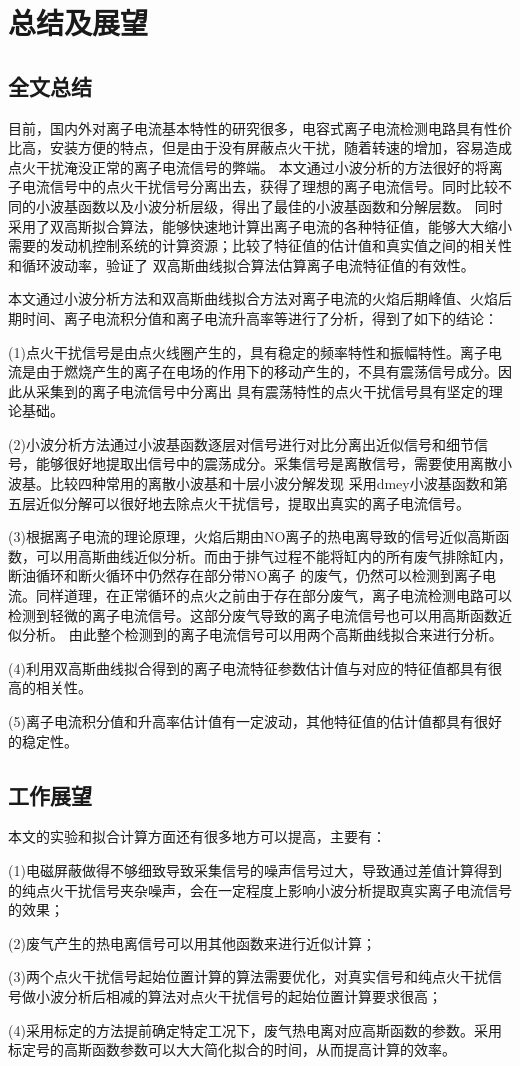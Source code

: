 \chapter{总结及展望}
\section{全文总结}
目前，国内外对离子电流基本特性的研究很多，电容式离子电流检测电路具有性价比高，安装方便的特点，但是由于没有屏蔽点火干扰，随着转速的增加，容易造成点火干扰淹没正常的离子电流信号的弊端。
本文通过小波分析的方法很好的将离子电流信号中的点火干扰信号分离出去，获得了理想的离子电流信号。同时比较不同的小波基函数以及小波分析层级，得出了最佳的小波基函数和分解层数。
同时采用了双高斯拟合算法，能够快速地计算出离子电流的各种特征值，能够大大缩小需要的发动机控制系统的计算资源；比较了特征值的估计值和真实值之间的相关性和循环波动率，验证了
双高斯曲线拟合算法估算离子电流特征值的有效性。\par
本文通过小波分析方法和双高斯曲线拟合方法对离子电流的火焰后期峰值、火焰后期时间、离子电流积分值和离子电流升高率等进行了分析，得到了如下的结论：\par
(1)点火干扰信号是由点火线圈产生的，具有稳定的频率特性和振幅特性。离子电流是由于燃烧产生的离子在电场的作用下的移动产生的，不具有震荡信号成分。因此从采集到的离子电流信号中分离出
具有震荡特性的点火干扰信号具有坚定的理论基础。\par
(2)小波分析方法通过小波基函数逐层对信号进行对比分离出近似信号和细节信号，能够很好地提取出信号中的震荡成分。采集信号是离散信号，需要使用离散小波基。比较四种常用的离散小波基和十层小波分解发现
采用dmey小波基函数和第五层近似分解可以很好地去除点火干扰信号，提取出真实的离子电流信号。\par
(3)根据离子电流的理论原理，火焰后期由NO离子的热电离导致的信号近似高斯函数，可以用高斯曲线近似分析。而由于排气过程不能将缸内的所有废气排除缸内，断油循环和断火循环中仍然存在部分带NO离子
的废气，仍然可以检测到离子电流。同样道理，在正常循环的点火之前由于存在部分废气，离子电流检测电路可以检测到轻微的离子电流信号。这部分废气导致的离子电流信号也可以用高斯函数近似分析。
由此整个检测到的离子电流信号可以用两个高斯曲线拟合来进行分析。\par
(4)利用双高斯曲线拟合得到的离子电流特征参数估计值与对应的特征值都具有很高的相关性。\par
(5)离子电流积分值和升高率估计值有一定波动，其他特征值的估计值都具有很好的稳定性。
\section{工作展望}
本文的实验和拟合计算方面还有很多地方可以提高，主要有：\par
(1)电磁屏蔽\cite{cyb2012,tb2009}做得不够细致导致采集信号的噪声信号过大，导致通过差值计算得到的纯点火干扰信号夹杂噪声，会在一定程度上影响小波分析提取真实离子电流信号的效果；\par
(2)废气产生的热电离信号可以用其他函数来进行近似计算；\par
(3)两个点火干扰信号起始位置计算的算法需要优化，对真实信号和纯点火干扰信号做小波分析后相减的算法对点火干扰信号的起始位置计算要求很高；\par
(4)采用标定的方法提前确定特定工况下，废气热电离对应高斯函数的参数。采用标定号的高斯函数参数可以大大简化拟合的时间，从而提高计算的效率。